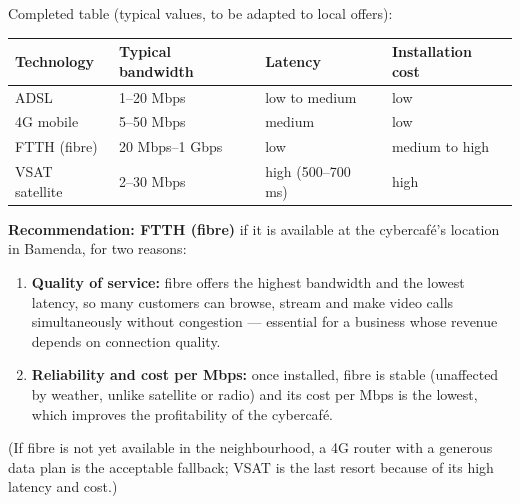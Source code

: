 \documentclass[11pt]{article}
\begin{document}
\begin{corrige}
Completed table (typical values, to be adapted to local offers):

\begin{center}
\begin{tabularx}{\linewidth}{|l|X|X|X|}\hline
\rowcolor{popblueL} \textbf{Technology} & \textbf{Typical bandwidth} & \textbf{Latency} & \textbf{Installation cost} \\ \hline
ADSL & 1--20 Mbps & low to medium & low \\ \hline
4G mobile & 5--50 Mbps & medium & low \\ \hline
FTTH (fibre) & 20 Mbps--1 Gbps & low & medium to high \\ \hline
VSAT satellite & 2--30 Mbps & high (500--700 ms) & high \\ \hline
\end{tabularx}
\end{center}

\textbf{Recommendation: FTTH (fibre)} if it is available at the cybercaf\'e's location in Bamenda, for two reasons:
\begin{enumerate}
\item \textbf{Quality of service:} fibre offers the highest bandwidth and the lowest latency, so many customers can browse, stream and make video calls simultaneously without congestion — essential for a business whose revenue depends on connection quality.
\item \textbf{Reliability and cost per Mbps:} once installed, fibre is stable (unaffected by weather, unlike satellite or radio) and its cost per Mbps is the lowest, which improves the profitability of the cybercaf\'e.
\end{enumerate}
(If fibre is not yet available in the neighbourhood, a 4G router with a generous data plan is the acceptable fallback; VSAT is the last resort because of its high latency and cost.)
\end{corrige}
\end{document}
